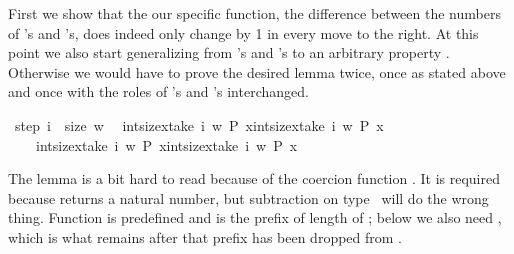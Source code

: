 \begin{isabellebody}
\begin{isamarkuptext}
First we show that the our specific function, the difference between the
numbers of 's and 's, does indeed only change by 1 in every
move to the right. At this point we also start generalizing from 's
and 's to an arbitrary property . Otherwise we would have
to prove the desired lemma twice, once as stated above and once with the
roles of 's and 's interchanged.%
\end{isamarkuptext}%
\ step{}{\isacharcolon}\ {\isachardoublequote}{\isasymforall}i\ {\isacharless}\ size\ w{\isachardot}\isanewline
\ \ {\isasymbar}{\isacharparenleft}int{\isacharparenleft}size{\isacharbrackleft}x{\isasymin}take\ {\isacharparenleft}i{\isacharplus}{}{\isacharparenright}\ w{\isachardot}\ P\ x{\isacharbrackright}{\isacharparenright}{\isacharminus}int{\isacharparenleft}size{\isacharbrackleft}x{\isasymin}take\ {\isacharparenleft}i{\isacharplus}{}{\isacharparenright}\ w{\isachardot}\ {\isasymnot}P\ x{\isacharbrackright}{\isacharparenright}{\isacharparenright}\isanewline
\ \ \ {\isacharminus}\ {\isacharparenleft}int{\isacharparenleft}size{\isacharbrackleft}x{\isasymin}take\ i\ w{\isachardot}\ P\ x{\isacharbrackright}{\isacharparenright}{\isacharminus}int{\isacharparenleft}size{\isacharbrackleft}x{\isasymin}take\ i\ w{\isachardot}\ {\isasymnot}P\ x{\isacharbrackright}{\isacharparenright}{\isacharparenright}{\isasymbar}\ {\isasymle}\ {\isacharhash}{}{\isachardoublequote}%
\begin{isamarkuptxt}%
\noindent
The lemma is a bit hard to read because of the coercion function
. It is required because  returns
a natural number, but subtraction on type~ will do the wrong thing.
Function  is predefined and  is the prefix of
length  of ; below we also need , which
is what remains after that prefix has been dropped from .


\end{isamarkuptxt}
\end{isabellebody}
